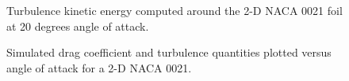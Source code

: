 \begin{figure}[ht]
    \centering
    
    \caption{Turbulence kinetic energy computed around the 2-D NACA 0021 foil at
        20 degrees angle of attack.}
    
    \label{fig:NACA-foil-k}
\end{figure}


\begin{figure}[ht]
    \centering
    
    \caption{Simulated drag coefficient and turbulence quantities plotted versus
        angle of attack for a 2-D NACA 0021.}
    
    \label{fig:NACA-foil-turbulence}
\end{figure}
